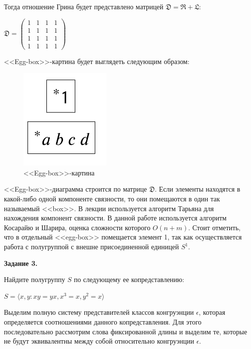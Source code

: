 \documentclass[bachelor, och, labwork]{shiza}
\begin{document}
    Тогда отношение Грина будет представлено матрицей $\mathfrak{D} = \mathfrak{R} + \mathfrak{L}$:

    \begin{center}
      $\mathfrak{D} =
      \begin{pmatrix}
        1 & 1 & 1 & 1 \\
        1 & 1 & 1 & 1 \\
        1 & 1 & 1 & 1 \\
        1 & 1 & 1 & 1
      \end{pmatrix}$
    \end{center}

    <<Egg-box>>-картина будет выглядеть следующим образом:

      \begin{figure}[H]
        \centering
        \includegraphics[width=0.4\textwidth]{photo/egg-box1.png}
        \caption{<<Egg-box>>-картина}
      \end{figure}

      <<Egg-box>>-диаграмма строится по матрице $\mathfrak{D}$. Если элементы находятся в какой-либо одной компоненте связности, то они помещаются в один так
      называемый <<box>>. В лекции используется алгоритм Тарьяна для нахождения компонент связности. В данной работе используется алгоритм Косарайю и Шарира,
      оценка сложности которого $O(n + m)$. Стоит отметить, что в отдельный <<egg-box>> помещается элемент 1, так как осуществляется работа с полугруппой 
      с внешне присоединенной единицей $S^1$.

    \textbf{Задание 3.}
    
    Найдите полугруппу $S$ по следующему ее копредставлению:
    \begin{center}

      $S = \langle x,y : xy = yx, x^3 = x, y^2 = x \rangle$
    \end{center}

    Выделим полную систему представителей классов конгруэнции $\epsilon$, которая определяется соотношениями данного
    копредставления. Для этого последовательно рассмотрим слова фиксированной длины и
    выделим те, которые не будут эквивалентны между собой относительно конгруэнции $\epsilon$.
\end{document}
